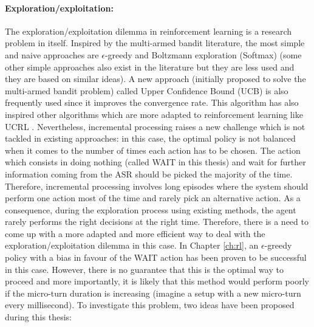         \paragraph{Exploration/exploitation:} The exploration/exploitation dilemma in reinforcement learning is a research problem in itself. Inspired by the multi-armed bandit literature, the most simple and naive approaches are $\epsilon$-greedy and Boltzmann exploration (Softmax) \cite{Sutton1998} (some other simple approaches also exist in the literature but they are less used and they are based on similar ideas). A new approach (initially proposed to solve the multi-armed bandit problem) called Upper Confidence Bound (UCB) \cite{Auer2002} is also frequently used since it improves the convergence rate. This algorithm has also inspired other algorithms which are more adapted to reinforcement learning like UCRL \cite{Auer2006}. Nevertheless, incremental processing raises a new challenge which is not tackled in existing approaches: in this case, the optimal policy is not balanced when it comes to the number of times each action has to be chosen. The action which consists in doing nothing (called WAIT in this thesis) and wait for further information coming from the ASR should be picked the majority of the time. Therefore, incremental processing involves long episodes where the system should perform one action most of the time and rarely pick an alternative action. As a consequence, during the exploration process using existing methods, the agent rarely performs the right decisions at the right time. Therefore, there is a need to come up with a more adapted and more efficient way to deal with the exploration/exploitation dilemma in this case. In Chapter \ref{ch:rl}, an $\epsilon$-greedy policy with a bias in favour of the WAIT action has been proven to be successful in this case. However, there is no guarantee that this is the optimal way to proceed and more importantly, it is likely that this method would perform poorly if the micro-turn duration is increasing (imagine a setup with a new micro-turn every millisecond). To investigate this problem, two ideas have been proposed during this thesis:

